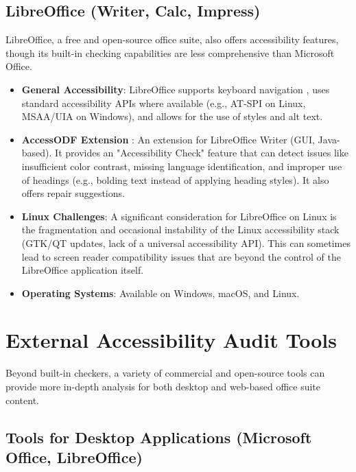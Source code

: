 \subsection{LibreOffice (Writer, Calc, Impress)}
\label{subsec:libreoffice}
LibreOffice, a free and open-source office suite, also offers accessibility features, though its built-in checking capabilities are less comprehensive than Microsoft Office.
\begin{itemize}
    \item \textbf{General Accessibility}: LibreOffice supports keyboard navigation \cite{libreofficekeyboardnav}, uses standard accessibility APIs where available (e.g., AT-SPI on Linux, MSAA/UIA on Windows), and allows for the use of styles and alt text.

    \item \textbf{AccessODF Extension} \cite{accessodf}: An extension for LibreOffice Writer (GUI, Java-based). It provides an "Accessibility Check" feature that can detect issues like insufficient color contrast, missing language identification, and improper use of headings (e.g., bolding text instead of applying heading styles). It also offers repair suggestions.

    \item \textbf{Linux Challenges}: A significant consideration for LibreOffice on Linux is the fragmentation and occasional instability of the Linux accessibility stack (GTK/QT updates, lack of a universal accessibility API). This can sometimes lead to screen reader compatibility issues that are beyond the control of the LibreOffice application itself.

    \item \textbf{Operating Systems}: Available on Windows, macOS, and Linux.

\end{itemize}

\section{External Accessibility Audit Tools}
\label{sec:office-external-audit-tools}

Beyond built-in checkers, a variety of commercial and open-source tools can provide more in-depth analysis for both desktop and web-based office suite content.

\subsection{Tools for Desktop Applications (Microsoft Office, LibreOffice)}
\label{subsec:desktop-audit-tools}

